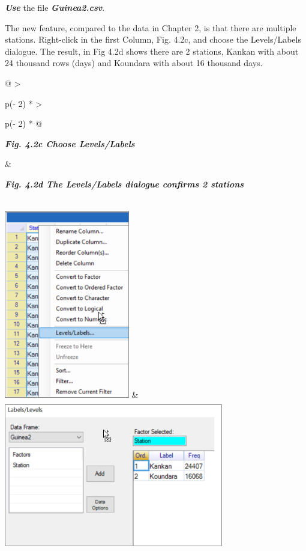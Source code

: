 \documentclass[
  letterpaper,
  DIV=11,
  numbers=noendperiod]{scrreprt}
\begin{document}
\textbf{\emph{Use}} the file \textbf{\emph{Guinea2.csv}}.

The new feature, compared to the data in Chapter 2, is that there are
multiple stations. Right-click in the first Column, Fig. 4.2c, and
choose the Levels/Labels dialogue. The result, in Fig 4.2d shows there
are 2 stations, Kankan with about 24 thousand rows (days) and Koundara
with about 16 thousand days.

\begin{longtable}[]{@{}
  >{\raggedright\arraybackslash}p{(\columnwidth - 2\tabcolsep) * }
  >{\raggedright\arraybackslash}p{(\columnwidth - 2\tabcolsep) * }@{}}
\toprule\noalign{}
\begin{minipage}[b]{\linewidth}\raggedright
\textbf{\emph{Fig. 4.2c Choose Levels/Labels}}
\end{minipage} & \begin{minipage}[b]{\linewidth}\raggedright
\textbf{\emph{Fig. 4.2d The Levels/Labels dialogue confirms 2 stations}}
\end{minipage} \\
\midrule\noalign{}
\endhead
\bottomrule\noalign{}
\endlastfoot
\includegraphics[width=2.1535in,height=3.25292in]{figures/Fig4.2c.png} &
\includegraphics[width=3.7725in,height=2.58565in]{figures/Fig4.2d.png} \\
\end{longtable}
\end{document}
